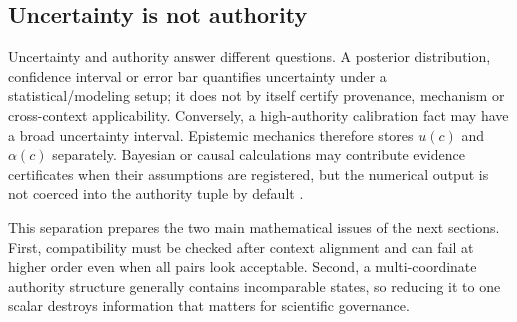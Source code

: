 \subsection{Uncertainty is not authority}

Uncertainty and authority answer different questions. A posterior distribution, confidence interval or error bar quantifies uncertainty under a statistical/modeling setup; it does not by itself certify provenance, mechanism or cross-context applicability. Conversely, a high-authority calibration fact may have a broad uncertainty interval. Epistemic mechanics therefore stores \(u(c)\) and \(\alpha(c)\) separately. Bayesian or causal calculations may contribute evidence certificates when their assumptions are registered, but the numerical output is not coerced into the authority tuple by default \cite{pearl2009}.

This separation prepares the two main mathematical issues of the next sections. First, compatibility must be checked after context alignment and can fail at higher order even when all pairs look acceptable. Second, a multi-coordinate authority structure generally contains incomparable states, so reducing it to one scalar destroys information that matters for scientific governance.

